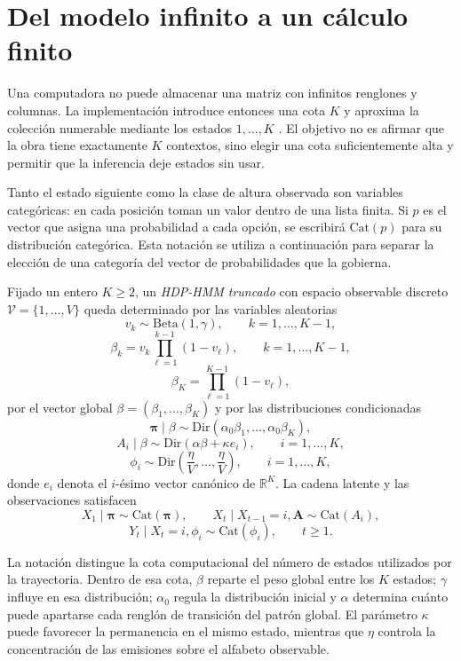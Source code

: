 \section{Del modelo infinito a un cálculo finito}

Una computadora no puede almacenar una matriz con infinitos renglones y columnas. La implementación introduce entonces una cota $K$ y aproxima la colección numerable mediante los estados $1,\ldots,K$ \cite{ishwaran2001,fox2011,vangael2008}. El objetivo no es afirmar que la obra tiene exactamente $K$ contextos, sino elegir una cota suficientemente alta y permitir que la inferencia deje estados sin usar.

Tanto el estado siguiente como la clase de altura observada son variables categóricas: en cada posición toman un valor dentro de una lista finita. Si $p$ es el vector que asigna una probabilidad a cada opción, se escribirá $\mathrm{Cat}(p)$ para su distribución categórica. Esta notación se utiliza a continuación para separar la elección de una categoría del vector de probabilidades que la gobierna.

\begin{Definicion}
Fijado un entero $K\geq 2$, un \emph{HDP-HMM truncado} con espacio observable discreto $\mathcal{V}=\{1,\dots,V\}$ queda determinado por las variables aleatorias
\[
v_k\sim \mathrm{Beta}(1,\gamma), \qquad k=1,\dots,K-1,
\]
\[
\beta_k=v_k\prod_{\ell=1}^{k-1}(1-v_{\ell}), \qquad k=1,\dots,K-1,
\]
\[
\beta_K=\prod_{\ell=1}^{K-1}(1-v_{\ell}),
\]
por el vector global $\beta=(\beta_1,\dots,\beta_K)$ y por las distribuciones condicionadas
\[
\boldsymbol{\pi}\mid \beta \sim \mathrm{Dir}(\alpha_0\beta_1,\dots,\alpha_0\beta_K),
\]
\[
A_i\mid \beta \sim \mathrm{Dir}(\alpha\beta+\kappa e_i), \qquad i=1,\dots,K,
\]
\[
\phi_i\sim \mathrm{Dir}\left(\frac{\eta}{V},\dots,\frac{\eta}{V}\right), \qquad i=1,\dots,K,
\]
donde $e_i$ denota el $i$-ésimo vector canónico de $\mathbb{R}^K$. La cadena latente y las observaciones satisfacen
\[
X_1\mid \boldsymbol{\pi}\sim \mathrm{Cat}(\boldsymbol{\pi}),
\qquad
X_t\mid X_{t-1}=i,\mathbf{A}\sim \mathrm{Cat}(A_i),
\]
\[
Y_t\mid X_t=i,\phi_i\sim \mathrm{Cat}(\phi_i), \qquad t\geq 1.
\]
\end{Definicion}

La notación distingue la cota computacional del número de estados utilizados por la trayectoria. Dentro de esa cota, $\beta$ reparte el peso global entre los $K$ estados; $\gamma$ influye en esa distribución; $\alpha_0$ regula la distribución inicial y $\alpha$ determina cuánto puede apartarse cada renglón de transición del patrón global. El parámetro $\kappa$ puede favorecer la permanencia en el mismo estado, mientras que $\eta$ controla la concentración de las emisiones sobre el alfabeto observable.

